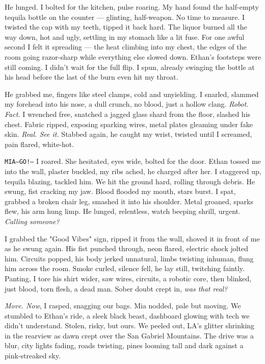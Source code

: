 \documentclass[12pt,oneside]{book}
\newcommand{\note}[1]{\texttt{#1}}
\begin{document}
He lunged. I bolted for the kitchen, pulse roaring. My hand found the half-empty tequila bottle on the counter — glinting, half-weapon. No time to measure. I twisted the cap with my teeth, tipped it back hard. The liquor burned all the way down, hot and ugly, settling in my stomach like a lit fuse. For one awful second I felt it spreading — the heat climbing into my chest, the edges of the room going razor-sharp while everything else slowed down. Ethan’s footsteps were still coming. I didn’t wait for the full flip. I spun, already swinging the bottle at his head before the last of the burn even hit my throat.

He grabbed me, fingers like steel clamps, cold and unyielding. I snarled, slammed my forehead into his nose, a dull crunch, no blood, just a hollow clang. \textit{Robot. Fact.} I wrenched free, snatched a jagged glass shard from the floor, slashed his chest. Fabric ripped, exposing sparking wires, metal plates gleaming under fake skin. \textit{Real. See it.} Stabbed again, he caught my wrist, twisted until I screamed, pain flared, white-hot.

\note{MIA—GO!—} I roared. She hesitated, eyes wide, bolted for the door. Ethan tossed me into the wall, plaster buckled, my ribs ached, he charged after her. I staggered up, tequila blazing, tackled him. We hit the ground hard, rolling through debris. He swung, fist cracking my jaw. Blood flooded my mouth, stars burst. I spat, grabbed a broken chair leg, smashed it into his shoulder. Metal groaned, sparks flew, his arm hung limp. He lunged, relentless, watch beeping shrill, urgent. \textit{Calling someone?}

I grabbed the "Good Vibes" sign, ripped it from the wall, shoved it in front of me as he swung again. His fist punched through, neon flared, electric shock jolted him. Circuits popped, his body jerked unnatural, limbs twisting inhuman, flung him across the room. Smoke curled, silence fell, he lay still, twitching faintly. Panting, I tore his shirt wider, saw wires, circuits, a robotic core, then blinked, just blood, torn flesh, a dead man. Sober doubt crept in, \textit{was that real?}

\textit{Move. Now}, I rasped, snagging our bags. Mia nodded, pale but moving. We stumbled to Ethan’s ride, a sleek black beast, dashboard glowing with tech we didn’t understand. Stolen, risky, but ours. We peeled out, LA’s glitter shrinking in the rearview as dawn crept over the San Gabriel Mountains. The drive was a blur, city lights fading, roads twisting, pines looming tall and dark against a pink-streaked sky.
\end{document}
